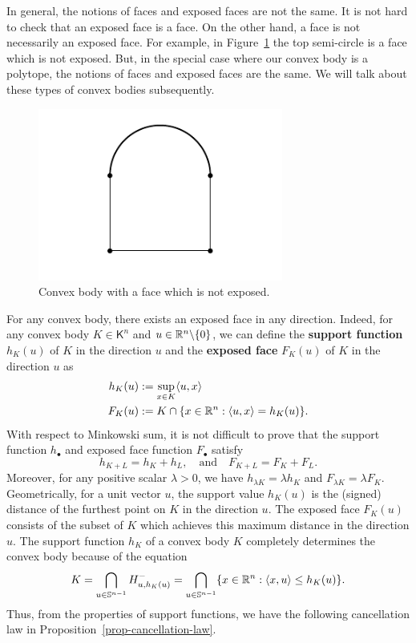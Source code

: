 \documentclass{puthesis-UG}
\begin{document}
\begin{remark}
	In general, the notions of faces and exposed faces are not the same. It is not hard to check that an exposed face is a face. On the other hand, a face is not necessarily an exposed face. For example, in Figure~\ref{counter-example} the top semi-circle is a face which is not exposed. But, in the special case where our convex body is a polytope, the notions of faces and exposed faces are the same. We will talk about these types of convex bodies subsequently. 
	
	\begin{figure}[h] \label{counter-example}
		\begin{center}
			\includegraphics[scale = 1]{image5.PNG}
			\caption{Convex body with a face which is not exposed.}
		\end{center}
	\end{figure}
	
\end{remark}

For any convex body, there exists an exposed  face in any direction. Indeed, for any convex body $K \in \mathsf{K}^n$ and $u \in \mathbb{R}^n \backslash \{0\}$, we can define the \textbf{support function} $h_K(u)$ of $K$ in the direction $u$ and the \textbf{exposed face} $F_K(u)$ of $K$ in the direction $u$ as 
\begin{align*}
	h_K(u) & := \sup_{x \in K} \langle u, x \rangle \\
	F_K(u) & := K \cap \{x \in \mathbb{R}^n : \langle u, x \rangle = h_K(u)\}.
\end{align*}
With respect to Minkowski sum, it is not difficult to prove that the support function $h_\bullet$ and exposed face function $F_\bullet$ satisfy
\[
	h_{K+L} = h_K + h_L, \quad \text{and} \quad F_{K+L} = F_K + F_L.
\]
Moreover, for any positive scalar $\lambda > 0$, we have $h_{\lambda K} = \lambda h_K$ and $F_{\lambda K} = \lambda F_K$. Geometrically, for a unit vector $u$, the support value $h_K(u)$ is the (signed) distance of the furthest point on $K$ in the direction $u$. The exposed face $F_K(u)$ consists of the subset of $K$ which achieves this maximum distance in the direction $u$. The support function $h_K$ of a convex body $K$ completely determines the convex body because of the equation 
\[
	K = \bigcap_{u \in \mathbb{S}^{n-1}} H^{-}_{u, h_K(u)} = \bigcap_{u \in \mathbb{S}^{n-1}} \{x \in \mathbb{R}^n : \langle x, u \rangle \leq h_K(u)\}.
\]
Thus, from the properties of support functions, we have the following cancellation law in Proposition~\ref{prop-cancellation-law}.
\end{document}
